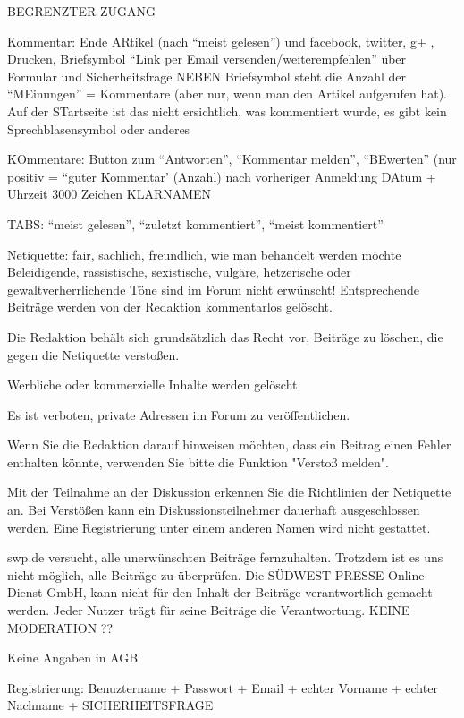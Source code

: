 BEGRENZTER ZUGANG 

Kommentar: Ende ARtikel (nach ``meist gelesen'') und facebook, twitter, g+ , Drucken, Briefsymbol ``Link per Email versenden/weiterempfehlen'' über Formular und Sicherheitsfrage
NEBEN Briefsymbol steht die Anzahl der ``MEinungen'' = Kommentare (aber nur, wenn man den Artikel aufgerufen hat). Auf der STartseite ist das nicht ersichtlich, was kommentiert wurde, es gibt kein Sprechblasensymbol oder anderes



KOmmentare: Button zum ``Antworten'', ``Kommentar melden'', ``BEwerten'' (nur positiv = ``guter Kommentar' (Anzahl) nach vorheriger Anmeldung
DAtum + Uhrzeit
3000 Zeichen 
KLARNAMEN



TABS: ``meist gelesen'', ``zuletzt kommentiert'', ``meist kommentiert''


Netiquette:
fair, sachlich, freundlich, wie man behandelt werden möchte
Beleidigende, rassistische, sexistische, vulgäre, hetzerische oder gewaltverherrlichende Töne sind im Forum nicht erwünscht! Entsprechende Beiträge werden von der Redaktion kommentarlos gelöscht.

Die Redaktion behält sich grundsätzlich das Recht vor, Beiträge zu löschen, die gegen die Netiquette verstoßen.

Werbliche oder kommerzielle Inhalte werden gelöscht.

Es ist verboten, private Adressen im Forum zu veröffentlichen.

Wenn Sie die Redaktion darauf hinweisen möchten, dass ein Beitrag einen Fehler enthalten könnte, verwenden Sie bitte die Funktion "Verstoß melden".
 
Mit der Teilnahme an der Diskussion erkennen Sie die Richtlinien der Netiquette an. Bei Verstößen kann ein  Diskussionsteilnehmer dauerhaft ausgeschlossen werden. Eine Registrierung unter einem anderen Namen wird nicht gestattet.
   
swp.de versucht, alle unerwünschten Beiträge fernzuhalten. Trotzdem ist es uns nicht möglich, alle Beiträge zu überprüfen. Die SÜDWEST PRESSE Online-Dienst GmbH, kann nicht für den Inhalt der Beiträge verantwortlich gemacht werden. Jeder Nutzer trägt für seine Beiträge die Verantwortung.
KEINE MODERATION ??    
     
      
 Keine Angaben in AGB       


Registrierung: 
Benuztername + Passwort + Email + echter Vorname + echter Nachname + SICHERHEITSFRAGE